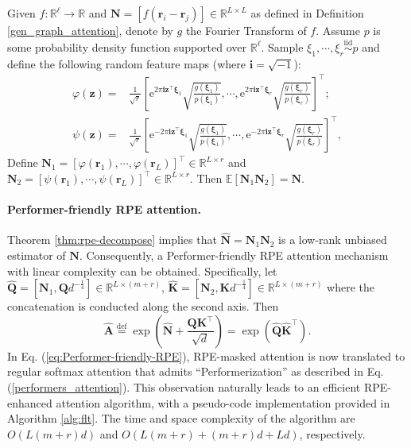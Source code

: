 \begin{theorem}
\label{thm:rpe-decompose}
    Given $f:\mathbb{R}^{\ell} \rightarrow \mathbb{R}$ and
    $\mathbf{N} = [f(\mathbf{r}_{i}-\mathbf{r}_{j})] \in \mathbb{R}^{L \times L}$ as defined in Definition \ref{gen_graph_attention}, denote by $g$ the Fourier Transform of $f$. Assume $p$ is some probability density function supported over $\mathbb{R}^{\ell}$. Sample $\xi_1, \cdots, \xi_r\overset{\mathrm{iid}}{\sim} p$ and define the following random feature maps (where $\mathbf{i}=\sqrt{-1}$):
    \begin{align*}
        \varphi(\mathbf{z})=&\tfrac{1}{\sqrt{r}}\left[\mathrm{e}^{2\pi \mathbf{i}\mathbf{z}^{\top}\boldsymbol{\xi}_1}\sqrt{\tfrac{g(\boldsymbol{\xi}_1)}{p(\boldsymbol{\xi}_1)}}, \cdots, \mathrm{e}^{2\pi \mathbf{i}\mathbf{z}^{\top}\boldsymbol{\xi}_r}\sqrt{\tfrac{g(\boldsymbol{\xi}_r)}{p(\boldsymbol{\xi}_r)}}\right]^{\top};\\
        \psi(\mathbf{z})=&\tfrac{1}{\sqrt{r}}\left[\mathrm{e}^{-2\pi \mathbf{i}\mathbf{z}^{\top}\boldsymbol{\xi}_1}\sqrt{\tfrac{g(\boldsymbol{\xi}_1)}{p(\boldsymbol{\xi}_1)}}, \cdots, \mathrm{e}^{-2\pi \mathbf{i}\mathbf{z}^{\top}\boldsymbol{\xi}_r}\sqrt{\tfrac{g(\boldsymbol{\xi}_r)}{p(\boldsymbol{\xi}_r)}}\right]^{\top},
    \end{align*}
    Define $\mathbf{N}_{1}=  \left[\varphi(\mathbf{r}_{1}),\cdots,\varphi(\mathbf{r}_{L})\right]^{\top} \in \mathbb{R}^{L \times r}$ and $\mathbf{N}_{2}=\left[\psi(\mathbf{r}_{1}),\cdots,\psi(\mathbf{r}_{L})\right]^{\top} \in \mathbb{R}^{L \times r}$. Then $\mathbb E [\mathbf{N}_{1}\mathbf{N}_{2}] = \mathbf{N}$.
\end{theorem}

\paragraph{Performer-friendly RPE attention.}Theorem \ref{thm:rpe-decompose} implies that $\widehat{\mathbf{N}}=\mathbf{N}_{1}\mathbf{N}_{2}$ is a low-rank unbiased estimator of $\mathbf{N}$. Consequently, a Performer-friendly RPE attention mechanism with linear complexity can be obtained. Specifically, let $\widehat{\mathbf{Q}} = [\mathbf{N}_{1},\mathbf{Q}d^{-\frac{1}{4}}] \in \mathbb{R}^{L \times (m+r)}$,
$\widehat{\mathbf{K}} = [\mathbf{N}_{2},\mathbf{K}d^{-\frac{1}{4}}] \in \mathbb{R}^{L \times (m+r)}$ where the concatenation is conducted along the second axis. Then
\begin{equation}
\label{eq:Performer-friendly-RPE}
\widehat{\mathbf{A}} \overset{\mathrm{def}}{=} \exp\left(\widehat{\mathbf{N}}+\frac{\mathbf{Q}\mathbf{K}^{\top}}{\sqrt{d}}\right)
= \exp\left(\widehat{\mathbf{Q}}\widehat{\mathbf{K}}^{\top}\right).
\end{equation}
In Eq. (\ref{eq:Performer-friendly-RPE}), RPE-masked attention is now translated to regular softmax attention that admits ``Performerization'' as described in Eq. (\ref{performers_attention}). This observation naturally leads to an efficient RPE-enhanced attention algorithm, with a pseudo-code implementation provided in Algorithm \ref{alg:flt}. The time and space complexity of the algorithm are $O(L(m+r)d)$ and $O(L(m+r)+(m+r)d+Ld)$, respectively.

